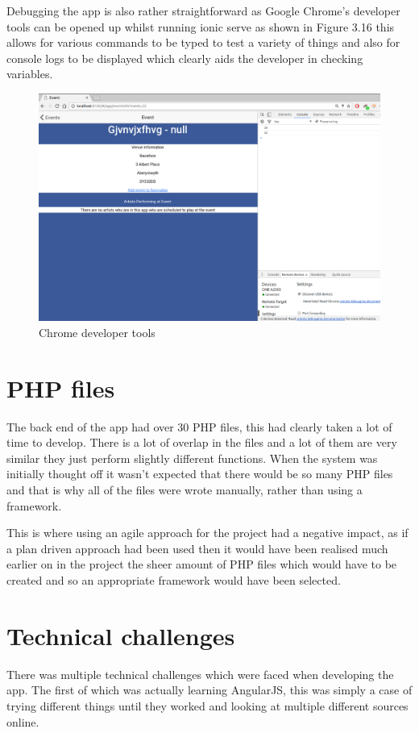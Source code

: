 Debugging the app is also rather straightforward as Google Chrome's developer tools can be opened up whilst running ionic serve as shown in Figure 3.16 this allows for various commands to be typed to test a variety of things and also for console logs to be displayed which clearly aids the developer in checking variables.
\begin{center}
\begin{figure}[H]
\includegraphics[scale=0.45]{images/chrome2}
\caption{Chrome developer tools}
\end{figure}
\end{center}

\section{PHP files}
The back end of the app had over 30 PHP files, this had clearly taken a lot of time to develop. There is a lot of overlap in the files and a lot of them are very similar they just perform slightly different functions. When the system was initially thought off it wasn't expected that there would be so many PHP files and that is why all of the files were wrote manually, rather than using a framework. 

This is where using an agile approach for the project had a negative impact, as if a plan driven approach had been used then it would have been realised much earlier on in the project the sheer amount of PHP files which would have to be created and so an appropriate framework would have been selected.

\section{Technical challenges}
There was multiple technical challenges which were faced when developing the app. The first of which was actually learning AngularJS, this was simply a case of trying different things until they worked and looking at multiple different sources online.

